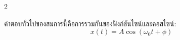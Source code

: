 \begin{paracol}{2}
\begin{thai}
คำตอบทั่วไปของสมการนี้คือการรวมกันของฟังก์ชันไซน์และคอสไซน์:
\begin{equation}
    x(t) = A \cos(\omega_0 t + \phi)
\end{equation}
\end{thai}
\end{paracol}
